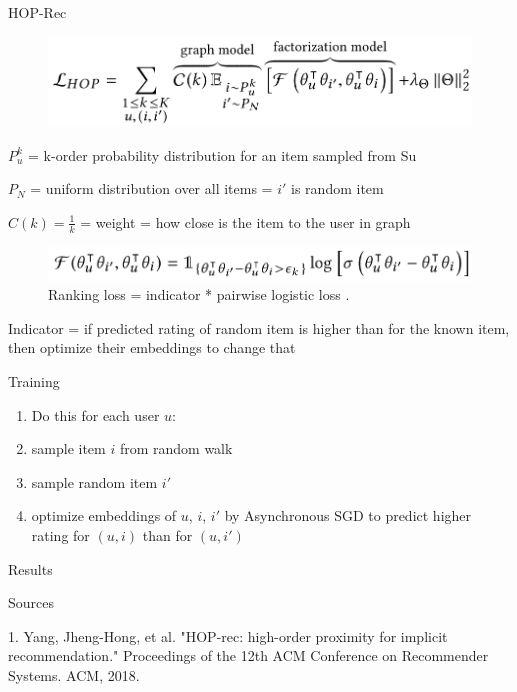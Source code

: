 \documentclass{beamer}
\begin{document}
\begin{frame}{HOP-Rec}

\begin{figure}[h]
\includegraphics[scale=0.60]{img/loss}
\end{figure}

$P_u^k$ = k-order probability distribution for an
item sampled from Su

$P_N$ = uniform distribution over all items = $i'$ is random item

$C(k) = \frac{1}{k}$ = weight = how close is the item to the user in graph

\begin{figure}[h]
\includegraphics[scale=0.60]{img/log-loss}
\caption{Ranking loss = indicator * pairwise logistic loss \cite{cit:hop-rec}.}
\end{figure}

Indicator = if predicted rating of random item is higher than for the known item, then optimize their embeddings to change that

\end{frame}
\begin{frame}{Training}

\begin{enumerate}
\item Do this for each user $u$:
\item sample item $i$ from random walk
\item sample random item $i'$
\item optimize embeddings of $u$, $i$, $i'$ by Asynchronous SGD to predict higher rating for $(u,i)$ than for $(u,i')$ 
\end{enumerate}

\end{frame}
\begin{frame}{Results}

\end{frame}


\begin{frame}{Sources}

\begin{thebibliography}{0}

   1. Yang, Jheng-Hong, et al. "HOP-rec: high-order proximity for implicit recommendation." Proceedings of the 12th ACM Conference on Recommender Systems. ACM, 2018.
  
\end{thebibliography}

\end{frame}

 
 
 
\end{document}
